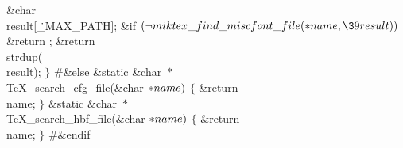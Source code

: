 \&{char} \\{result}[\.{\_MAX\_PATH}];\7
\&{if} ${}(\R\\{miktex\_find\_miscfont\_file}({*}\\{name},\39\\{result})){}$\1\5
\&{return} ;\2\6
\&{return} \\{strdup}(\\{result});\6
\4${}\}{}$\2\7
\8\#\&{else}\7
\&{static} \&{char} ${}{*}{}$\\{TeX\_search\_cfg\_file}(\&{char} ${}{*}%
\\{name}){}$\1\1\2\2\6
${}\{{}$\1\6
\&{return} \\{name};\6
\4${}\}{}$\2\7
\&{static} \&{char} ${}{*}{}$\\{TeX\_search\_hbf\_file}(\&{char} ${}{*}%
\\{name}){}$\1\1\2\2\6
${}\{{}$\1\6
\&{return} \\{name};\6
\4${}\}{}$\2\6
\8\#\&{endif}\par
\fi

